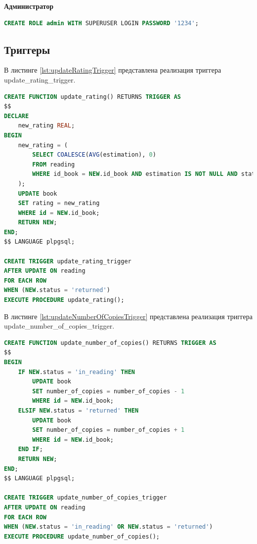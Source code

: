 \textbf{Администратор}
\begin{lstlisting}[label={lst:admin},caption=Создание пользователя admin., language=SQL]
CREATE ROLE admin WITH SUPERUSER LOGIN PASSWORD '1234';
\end{lstlisting}

\subsection{Триггеры}
В листинге \ref{lst:updateRatingTrigger} представлена реализация триггера update\_rating\_trigger.
\begin{lstlisting}[label={lst:updateRatingTrigger},caption=Реализация триггера update\_rating\_trigger., language=SQL]
CREATE FUNCTION update_rating() RETURNS TRIGGER AS 
$$
DECLARE
	new_rating REAL;
BEGIN
	new_rating = (
		SELECT COALESCE(AVG(estimation), 0)
		FROM reading 
		WHERE id_book = NEW.id_book AND estimation IS NOT NULL AND status = 'returned'
	);
	UPDATE book
	SET rating = new_rating
	WHERE id = NEW.id_book;
	RETURN NEW;
END;
$$ LANGUAGE plpgsql;

CREATE TRIGGER update_rating_trigger
AFTER UPDATE ON reading 
FOR EACH ROW 
WHEN (NEW.status = 'returned')
EXECUTE PROCEDURE update_rating();
\end{lstlisting}

В листинге \ref{lst:updateNumberOfCopiesTrigger} представлена реализация триггера update\_number\_of\_copies\_trigger.
\begin{lstlisting}[label={lst:updateNumberOfCopiesTrigger},caption=Реализация триггера update\_number\_of\_copies\_trigger., language=SQL]
CREATE FUNCTION update_number_of_copies() RETURNS TRIGGER AS 
$$
BEGIN
	IF NEW.status = 'in_reading' THEN
		UPDATE book
		SET number_of_copies = number_of_copies - 1
		WHERE id = NEW.id_book;
	ELSIF NEW.status = 'returned' THEN
		UPDATE book
		SET number_of_copies = number_of_copies + 1
		WHERE id = NEW.id_book;
	END IF;
	RETURN NEW;
END;
$$ LANGUAGE plpgsql;

CREATE TRIGGER update_number_of_copies_trigger
AFTER UPDATE ON reading 
FOR EACH ROW 
WHEN (NEW.status = 'in_reading' OR NEW.status = 'returned')
EXECUTE PROCEDURE update_number_of_copies();
\end{lstlisting}

